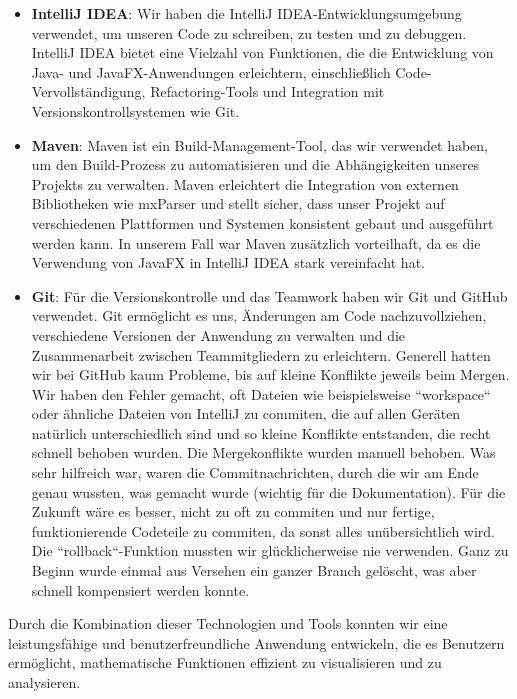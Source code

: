 \documentclass[a4paper]{article}
\begin{document}
\begin{itemize}
	\item \textbf{IntelliJ IDEA}: Wir haben die IntelliJ IDEA-Entwicklungsumgebung verwendet, um unseren Code zu schreiben, zu testen und zu debuggen. IntelliJ IDEA bietet eine Vielzahl von Funktionen, die die Entwicklung von Java- und JavaFX-Anwendungen erleichtern, einschließlich Code-Vervollständigung, Refactoring-Tools und Integration mit Versionskontrollsystemen wie Git.

	\item \textbf{Maven}: Maven ist ein Build-Management-Tool, das wir verwendet haben, um den Build-Prozess zu automatisieren und die Abhängigkeiten unseres Projekts zu verwalten. Maven erleichtert die Integration von externen Bibliotheken wie mxParser und stellt sicher, dass unser Projekt auf verschiedenen Plattformen und Systemen konsistent gebaut und ausgeführt werden kann. In unserem Fall war Maven zusätzlich vorteilhaft, da es die Verwendung von JavaFX in IntelliJ IDEA stark vereinfacht hat.

	      \newpage

	\item \textbf{Git}: Für die Versionskontrolle und das Teamwork haben wir Git und GitHub verwendet. Git ermöglicht es uns, Änderungen am Code nachzuvollziehen, verschiedene Versionen der Anwendung zu verwalten und die Zusammenarbeit zwischen Teammitgliedern zu erleichtern. Generell hatten wir bei GitHub kaum Probleme, bis auf kleine Konflikte jeweils beim Mergen. Wir haben den Fehler gemacht, oft Dateien wie beispielsweise ``workspace`` oder ähnliche Dateien von IntelliJ zu commiten, die auf allen Geräten natürlich unterschiedlich sind und so kleine Konflikte entstanden, die recht schnell behoben wurden. Die Mergekonflikte wurden manuell behoben. Was sehr hilfreich war, waren die Commitnachrichten, durch die wir am Ende genau wussten, was gemacht wurde (wichtig für die Dokumentation). Für die Zukunft wäre es besser, nicht zu oft zu commiten und nur fertige, funktionierende Codeteile zu commiten, da sonst alles unübersichtlich wird. Die ``rollback``-Funktion mussten wir glücklicherweise nie verwenden. Ganz zu Beginn wurde einmal aus Versehen ein ganzer Branch gelöscht, was aber schnell kompensiert werden konnte.
\end{itemize}

Durch die Kombination dieser Technologien und Tools konnten wir eine leistungsfähige und benutzerfreundliche Anwendung entwickeln, die es Benutzern ermöglicht, mathematische Funktionen effizient zu visualisieren und zu analysieren.
\end{document}
